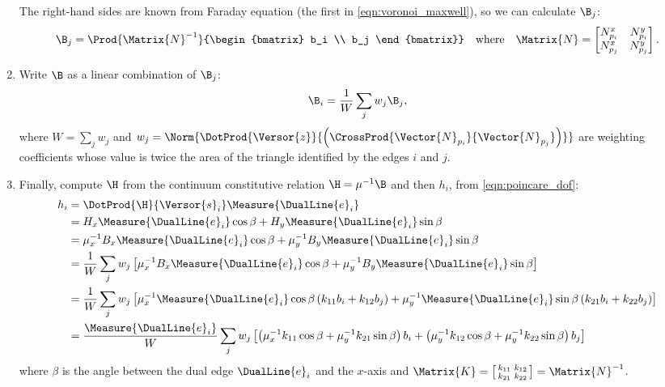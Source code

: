 \begin{enumerate}
  The right-hand sides are known from Faraday equation (the first
  in \eqref{eqn:voronoi_maxwell}), so we can calculate $\B_j$:
  \begin{align*}
    \B_j = \Prod{\Matrix{N}^{-1}}{\begin{bmatrix} b_i \\ b_j \end{bmatrix}}
    && \text{where} && \Matrix{N} = \begin{bmatrix} N^x_{p_i}
    & N^y_{p_i} \\ N^x_{p_j} & N^y_{p_j} \end{bmatrix} .
  \end{align*}
\item
  Write $\B$ as a linear combination of $\B_j$:
  \begin{equation*}
    \B_i = \frac{1}{W} \sum_j w_j \B_j ,
  \end{equation*}
  where $W = \sum_j w_j$ and $w_j = \Norm{\DotProd{\Versor{z}}{\left(
  \CrossProd{\Vector{N}_{p_i}}{\Vector{N}_{p_j}} \right)}}$ are
  weighting coefficients whose value is twice the area of the triangle
  identified by the edges $i$ and $j$.
\item
  Finally, compute $\H$ from the continuum constitutive relation $\H = \mu^{-1} \B$ and
  then $h_i$, from \eqref{eqn:poincare_dof}:
  \begin{equation} \label{eqn:poincare_constitutive_magnetic} \begin{split}
    h_i & = \DotProd{\H}{\Versor{s}_i} \Measure{\DualLine{e}_i} \\
    & = H_x \Measure{\DualLine{e}_i} \cos\beta + H_y \Measure{\DualLine{e}_i} \sin\beta \\
    & = \mu_x^{-1} B_x \Measure{\DualLine{e}_i} \cos\beta +
    \mu_y^{-1} B_y \Measure{\DualLine{e}_i} \sin\beta \\
    & = \frac{1}{W} \sum_j w_j \left[ \mu_x^{-1} B_x \Measure{\DualLine{e}_i}
    \cos\beta + \mu_y^{-1} B_y \Measure{\DualLine{e}_i}
    \sin\beta \right] \\
    & = \frac{1}{W} \sum_j w_j \left[ \mu_x^{-1} \Measure{\DualLine{e}_i}
    \cos\beta \left( k_{11} b_i + k_{12} b_j \right) +
    \mu_y^{-1} \Measure{\DualLine{e}_i} \sin\beta \left( k_{21} b_i +
    k_{22} b_j \right) \right] \\
    & = \frac{\Measure{\DualLine{e}_i}}{W} \sum_j w_j \left[ \left( \mu_x^{-1} k_{11}
    \cos\beta + \mu_y^{-1} k_{21} \sin\beta
    \right) b_i + \left( \mu_y^{-1} k_{12}
    \cos\beta + \mu_y^{-1} k_{22} \sin\beta
    \right) b_j \right]
  \end{split} \end{equation}
  where $\beta$ is the angle between the dual edge $\DualLine{e}_i$ and
  the $x$-axis and $\Matrix{K} = \bigl[ \begin{smallmatrix}
  k_{11}&k_{12}\\k_{21}&k_{22} \end{smallmatrix} \bigr] =
  \Matrix{N}^{-1}$.
  

\end{enumerate}
